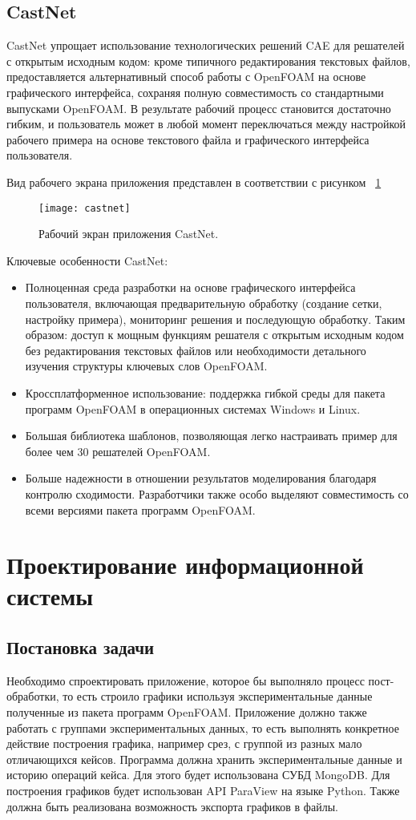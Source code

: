 \documentclass[14pt]{extreport}
\begin{document}
\section{CastNet}

CastNet упрощает использование технологических решений CAE для решателей с открытым исходным кодом: кроме типичного редактирования текстовых файлов, предоставляется альтернативный способ работы с OpenFOAM на основе графического интерфейса, сохраняя полную совместимость со стандартными выпусками OpenFOAM. В результате рабочий процесс становится достаточно гибким, и пользователь может в любой момент переключаться между настройкой рабочего примера на основе текстового файла и графического интерфейса пользователя.

Вид рабочего экрана приложения представлен в соответствии с рисунком ~\ref{fig4}
\begin{figure}[H]
\centerline{\texttt{[image: castnet]}}
\caption{Рабочий экран приложения CastNet.}
\label{fig4}
\end{figure}

Ключевые особенности CastNet:
\begin{itemize}
\item Полноценная среда разработки на основе графического интерфейса пользователя, включающая предварительную обработку (создание сетки, настройку примера), мониторинг решения и последующую обработку. Таким образом: доступ к мощным функциям решателя с открытым исходным кодом без редактирования текстовых файлов или необходимости детального изучения структуры ключевых слов OpenFOAM.
\item Кроссплатформенное использование: поддержка гибкой среды для пакета программ OpenFOAM в операционных системах Windows и Linux.
\item Большая библиотека шаблонов, позволяющая легко настраивать пример для более чем 30 решателей OpenFOAM.
\item Больше надежности в отношении результатов моделирования благодаря контролю сходимости.
Разработчики также особо выделяют совместимость со всеми версиями пакета программ OpenFOAM.
\end{itemize}

\chapter{Проектирование информационной системы}
\section{Постановка задачи}
Необходимо спроектировать приложение, которое бы выполняло процесс пост-обработки, то есть строило графики используя экспериментальные данные полученные из пакета программ OpenFOAM. Приложение должно также работать с группами экспериментальных данных, то есть выполнять конкретное действие построения графика, например срез, с группой из разных мало отличающихся кейсов. Программа должна хранить экспериментальные данные и историю операций кейса. Для этого будет использована СУБД MongoDB. Для построения графиков будет использован API ParaView на языке Python. Также должна быть реализована возможность экспорта графиков в файлы.
\end{document}
